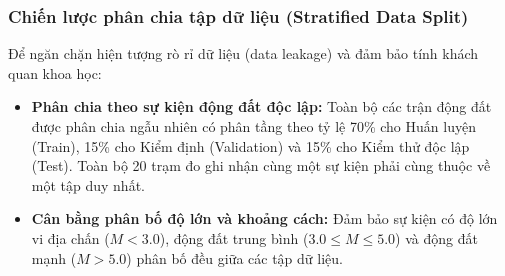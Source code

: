 \documentclass[preprint,1p]{elsarticle}
\begin{document}
\subsubsection{Chiến lược phân chia tập dữ liệu (Stratified Data Split)}
Để ngăn chặn hiện tượng rò rỉ dữ liệu (data leakage) và đảm bảo tính khách quan khoa học:
\begin{itemize}
    \item \textbf{Phân chia theo sự kiện động đất độc lập:} Toàn bộ các trận động đất được phân chia ngẫu nhiên có phân tầng theo tỷ lệ 70\% cho Huấn luyện (Train), 15\% cho Kiểm định (Validation) và 15\% cho Kiểm thử độc lập (Test). Toàn bộ 20 trạm đo ghi nhận cùng một sự kiện phải cùng thuộc về một tập duy nhất.
    \item \textbf{Cân bằng phân bố độ lớn và khoảng cách:} Đảm bảo sự kiện có độ lớn vi địa chấn ($M < 3.0$), động đất trung bình ($3.0 \le M \le 5.0$) và động đất mạnh ($M > 5.0$) phân bố đều giữa các tập dữ liệu.
\end{itemize}
\end{document}

